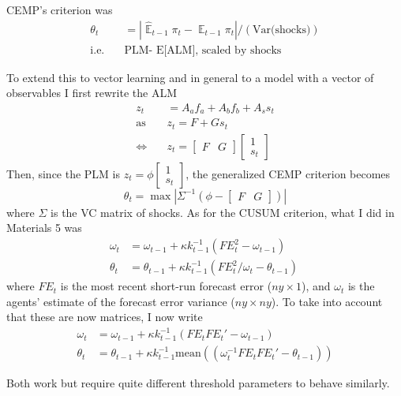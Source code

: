 \documentclass[11pt]{article}
\renewcommand{\[}{\begin{equation}}
\renewcommand{\]}{\end{equation}}
\DeclareMathOperator{\E}{\mathbb{E}}
\begin{document}
CEMP's criterion was 
\begin{align}
\theta_t & = |\hat{\E}_{t-1}\pi_t - \E_{t-1}\pi_t | / (\text{Var(shocks)}) \\
\text{i.e.} \quad &\text{PLM- E[ALM], scaled by shocks}
\end{align}

To extend this to vector learning and in general to a model with a vector of observables I first rewrite the ALM
\begin{align}
z_t & = A_a f_a + A_b f_b + A_s s_t \\
\text{as} \quad & z_t =  F  +Gs_t  \\
\Leftrightarrow \quad & z_t = \begin{bmatrix} F & G \end{bmatrix} \begin{bmatrix} 1 \\ s_t\end{bmatrix}
\end{align}
Then, since the PLM is $z_t = \phi  \begin{bmatrix} 1 \\ s_t\end{bmatrix}$, the generalized CEMP criterion becomes
\begin{equation}
\theta_t = \max | \Sigma^{-1} ( \phi - \begin{bmatrix} F & G \end{bmatrix}) |
\end{equation}
where $\Sigma$ is the VC matrix of shocks.
As for the CUSUM criterion, what I did in Materials 5 was
\begin{align}
 \omega_t & =  \omega_{t-1} + \kappa k_{t-1}^{-1}(FE_t^2 -\omega_{t-1})\\
\theta_t & =  \theta_{t-1} + \kappa k_{t-1}^{-1}(FE_t^2/\omega_t -\theta_{t-1})\
\end{align}
where $FE_t$ is the most recent short-run forecast error ($ny\times 1$), and $\omega_t$ is the agents' estimate of the forecast error variance ($ny \times ny$). To take into account that these are now matrices, I now write
\begin{align}
\omega_t & =  \omega_{t-1} + \kappa k_{t-1}^{-1}(FE_t FE_t' -\omega_{t-1})\\
\theta_t & =  \theta_{t-1} + \kappa k_{t-1}^{-1}\text{mean}((\omega_t^{-1}FE_t FE_t' -\theta_{t-1}))
\end{align}

Both work but require quite different threshold parameters to behave similarly.
\end{document}
